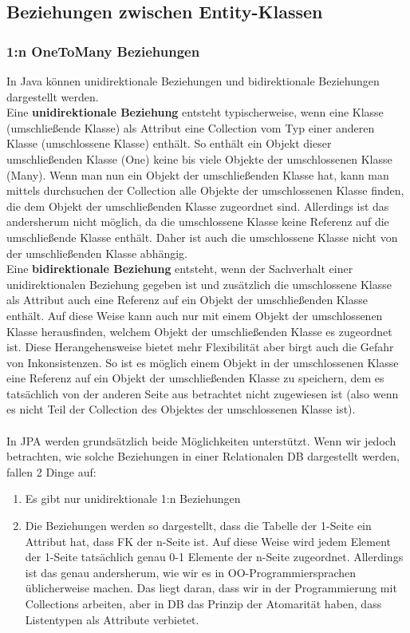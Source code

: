 \subsection{Beziehungen zwischen Entity-Klassen}

\subsubsection{1:n OneToMany Beziehungen}
In Java können unidirektionale Beziehungen und bidirektionale Beziehungen dargestellt werden.\\
Eine \textbf{unidirektionale Beziehung} entsteht typischerweise, wenn eine Klasse (umschließende Klasse) als Attribut eine Collection vom Typ einer anderen Klasse (umschlossene Klasse) enthält. So enthält ein Objekt dieser umschließenden Klasse (One) keine bis viele Objekte der umschlossenen Klasse (Many). Wenn man nun ein Objekt der umschließenden Klasse hat, kann man mittels durchsuchen der Collection alle Objekte der umschlossenen Klasse finden, die dem Objekt der umschließenden Klasse zugeordnet sind. Allerdings ist das andersherum nicht möglich, da die umschlossene Klasse keine Referenz auf die umschließende Klasse enthält. Daher ist auch die umschlossene Klasse nicht von der umschließenden Klasse abhängig.\\
Eine \textbf{bidirektionale Beziehung} entsteht, wenn der Sachverhalt einer unidirektionalen Beziehung gegeben ist und zusätzlich die umschlossene Klasse als Attribut auch eine Referenz auf ein Objekt der umschließenden Klasse enthält. Auf diese Weise kann auch nur mit einem Objekt der umschlossenen Klasse herausfinden, welchem Objekt der umschließenden Klasse es zugeordnet ist. Diese Herangehensweise bietet mehr Flexibilität aber birgt auch die Gefahr von Inkonsistenzen. So ist es möglich einem Objekt in der umschlossenen Klasse eine Referenz auf ein Objekt der umschließenden Klasse zu speichern, dem es tatsächlich von der anderen Seite aus betrachtet nicht zugewiesen ist (also wenn es nicht Teil der Collection des Objektes der umschlossenen Klasse ist).\\
\\
In JPA werden grundsätzlich beide Möglichkeiten unterstützt. Wenn wir jedoch betrachten, wie solche Beziehungen in einer Relationalen DB dargestellt werden, fallen 2 Dinge auf:
\begin{enumerate}
    \item Es gibt nur unidirektionale 1:n Beziehungen
    \item Die Beziehungen werden so dargestellt, dass die Tabelle der 1-Seite ein Attribut hat, dass FK der n-Seite ist. Auf diese Weise wird jedem Element der 1-Seite tatsächlich genau 0-1 Elemente der n-Seite zugeordnet. Allerdings ist das genau andersherum, wie wir es in OO-Programmiersprachen üblicherweise machen. Das liegt daran, dass wir in der Programmierung mit Collections arbeiten, aber in DB das Prinzip der Atomarität haben, dass Listentypen als Attribute verbietet.
\end{enumerate}
